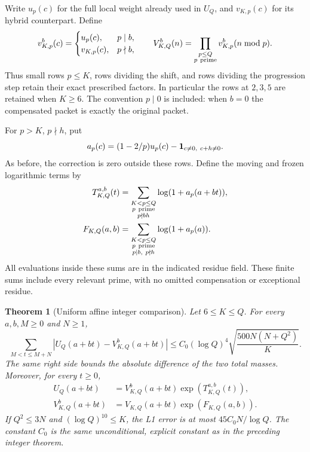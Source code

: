\documentclass[11pt]{article}
\newtheorem{theorem}{Theorem}[section]
\begin{document}
Write \(u_p(c)\) for the full local weight already used in \(U_Q\),
and \(v_{K,p}(c)\) for its hybrid counterpart. Define
\[
 v^b_{K,p}(c)=
 \begin{cases}
  u_p(c),&p\mid b,\\
  v_{K,p}(c),&p\nmid b,
 \end{cases}
 \qquad
 V^b_{K,Q}(n)=\prod_{\substack{p\leq Q\\p\ {\rm prime}}}
                         v^b_{K,p}(n\bmod p).
\]
Thus small rows \(p\leq K\), rows dividing the shift, and rows dividing
the progression step retain their exact prescribed factors.
In particular the rows at \(2,3,5\) are retained when \(K\geq6\).
The convention \(p\mid0\) is included: when \(b=0\) the compensated
packet is exactly the original packet.

For \(p>K\), \(p\nmid h\), put
\[
 a_p(c)=(1-2/p)u_p(c)
             -{\bf1}_{c\ne0,\ c+h\ne0}.
\]
As before, the correction is zero outside these rows.
Define the moving and frozen logarithmic terms by
\[
 \begin{split}
 T^{a,b}_{K,Q}(t)
   &=\sum_{\substack{K<p\leq Q\\p\ {\rm prime}\\p\nmid bh}}
                    \log(1+a_p(a+bt)),\\
 F_{K,Q}(a,b)
   &=\sum_{\substack{K<p\leq Q\\p\ {\rm prime}\\p\mid b,\ p\nmid h}}
                    \log(1+a_p(a)).
 \end{split}
\]
All evaluations inside these sums are in the indicated residue field.
These finite sums include every relevant prime, with no omitted
compensation or exceptional residue.

\begin{theorem}[Uniform affine integer comparison]
\label{thm:affineIntegerComparison}
Let \(6\leq K\leq Q\). For every \(a,b,M\geq0\) and \(N\geq1\),
\[
 \sum_{M<t\leq M+N}
   |U_Q(a+bt)-V^b_{K,Q}(a+bt)|
 \leq C_0(\log Q)^4
             \sqrt{\frac{500N(N+Q^2)}K}.
\]
The same right side bounds the absolute difference of the two
total masses. Moreover, for every \(t\geq0\),
\[
 \begin{split}
 U_Q(a+bt)&=V^b_{K,Q}(a+bt)\exp(T^{a,b}_{K,Q}(t)),\\
 V^b_{K,Q}(a+bt)&=V_{K,Q}(a+bt)\exp(F_{K,Q}(a,b)).
 \end{split}
\]
If \(Q^2\leq3N\) and \((\log Q)^{10}\leq K\), the L1 error is at most
\(45C_0N/\log Q\). The constant \(C_0\) is the same unconditional,
explicit constant as in the preceding integer theorem.
\end{theorem}
\end{document}
